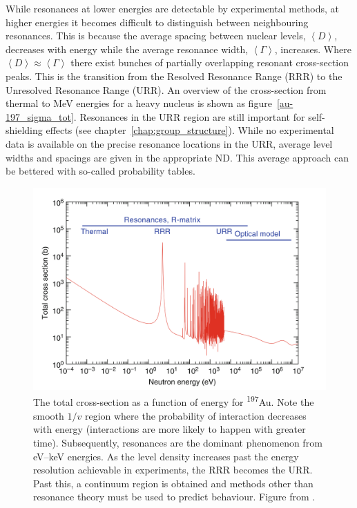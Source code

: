 While resonances at lower energies are detectable by experimental methods, at higher energies it becomes difficult to distinguish between neighbouring resonances. This is because the average spacing between nuclear levels, $\left<D\right>$, decreases with energy while the average resonance width, $\left<\Gamma\right>$, increases. Where $\left<D\right> \approx \left<\Gamma\right>$ there exist bunches of partially overlapping resonant cross-section peaks. This is the transition from the Resolved Resonance Range (RRR) to the Unresolved Resonance Range (URR). An overview of the cross-section from thermal to MeV energies for a heavy nucleus is shown as figure~\ref{au-197_sigma_tot}. Resonances in the URR region are still important for self-shielding effects (see chapter~\ref{chap:group_structure}). While no experimental data is available on the precise resonance locations in the URR, average level widths and spacings are given in the appropriate ND. This average approach can be bettered with so-called probability tables. 


\begin{figure}[ht]
  \includegraphics[width=\textwidth]{au-197_sigma_tot}
  \caption{The total cross-section as a function of energy for \textsuperscript{197}Au. Note the smooth $1/v$ region where the probability of interaction decreases with energy (interactions are more likely to happen with greater time). Subsequently, resonances are the dominant phenomenon from eV--keV energies. As the level density increases past the energy resolution achievable in experiments, the RRR becomes the URR. Past this, a continuum region is obtained and methods other than resonance theory must be used to predict behaviour. Figure from \cite{Cacuci2010}.}
  \label{fig:au-197_sigma_tot}
\end{figure}

